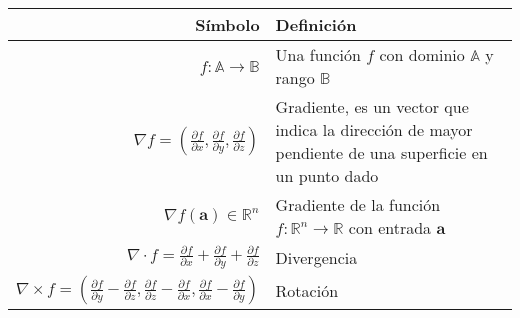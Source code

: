 \begin{table}[H]
    \begin{center}
        \begin{tabularx}{\textwidth}{|r|X|}
            \hline
            \textbf{Símbolo}                                                                                                                                                                                                                  & \textbf{Definición}                                                                                   \\
            \hline
            $ f: \mathbb{A} \rightarrow \mathbb{B} $                                                                                                                                                                                          & Una función $f$ con dominio $\mathbb{A}$ y rango $\mathbb{B}$                                         \\
            $ \nabla f = \left( \frac{\partial f}{\partial x}, \frac{\partial f}{\partial y}, \frac{\partial f}{\partial z} \right) $                                                                                                         & Gradiente, es un vector que indica la dirección de mayor pendiente de una superficie en un punto dado \\
            $ \nabla f(\mathbf{a}) \in \mathbb{R}^{n} $                                                                                                                                                                                       & Gradiente de la función $f: \mathbb{R}^{n} \rightarrow \mathbb{R}$ con entrada $\mathbf{a}$           \\
            $ \nabla \cdot f =  \frac{\partial f}{\partial x} + \frac{\partial f}{\partial y} + \frac{\partial f}{\partial z} $                                                                                                               & Divergencia                                                                                           \\
            $ \nabla \times f =  \left( \frac{\partial f}{\partial y} - \frac{\partial f}{\partial z}, \frac{\partial f}{\partial z} - \frac{\partial f}{\partial x}, \frac{\partial f}{\partial x} - \frac{\partial f}{\partial y}  \right)$ & Rotación                                                                                              \\

\end{tabularx}
\end{center}
\end{table}
